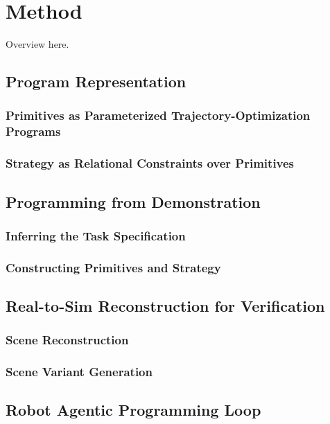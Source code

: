 \section{Method}
Overview here. 

\subsection{Program Representation}
\subsubsection{Primitives as Parameterized Trajectory-Optimization Programs}
\subsubsection{Strategy as Relational Constraints over Primitives}

\subsection{Programming from Demonstration}
\subsubsection{Inferring the Task Specification}
\subsubsection{Constructing Primitives and Strategy}

\subsection{Real-to-Sim Reconstruction for Verification}
\subsubsection{Scene Reconstruction}
\subsubsection{Scene Variant Generation}

\subsection{Robot Agentic Programming Loop}
